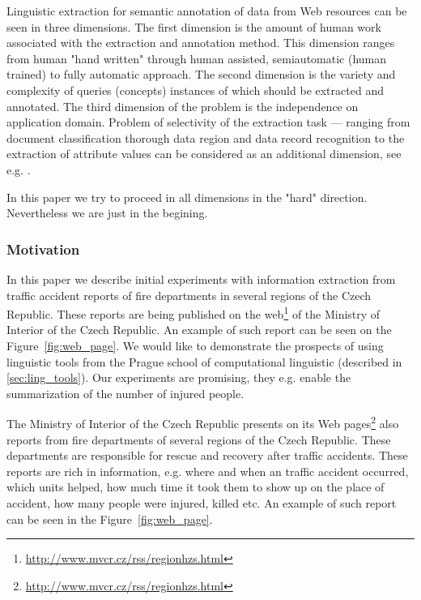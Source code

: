 Linguistic extraction for semantic annotation of data from Web resources can be seen in three dimensions. The first dimension is the amount of human work associated with the extraction and annotation method. This dimension ranges from human "hand written"  through human assisted, semiautomatic (human trained) to fully automatic approach. The second dimension is the variety and complexity of queries (concepts) instances of which should be extracted and annotated. The third dimension of the problem is the independence on application domain. Problem of selectivity of the extraction task --- ranging from document classification thorough data region and data record recognition to the extraction of attribute values can be considered as an additional dimension, see e.g.  \citep{biblio:Survey_of_Web_Information_Extraction_Systems}. 

In this paper we try to proceed in all dimensions in the "hard" direction. Nevertheless we are just in the begining.

\subsubsection{Motivation}



In this paper we describe initial experiments with information extraction from traffic accident reports of fire departments in several regions of the Czech Republic. These reports are being published on the web\footnote{\url{http://www.mvcr.cz/rss/regionhzs.html}} of the Ministry of Interior of the Czech Republic. An example of such report can be seen on the Figure~\ref{fig:web_page}. We would like to demonstrate the prospects of using linguistic tools from the Prague school of computational linguistic (described in \ref{sec:ling_tools}). Our experiments are promising, they e.g. enable the summarization of the number of injured people. 

The Ministry of Interior of the Czech Republic presents on its Web pages\footnote{\url{http://www.mvcr.cz/rss/regionhzs.html}} also reports from fire departments of several regions of the Czech Republic. These departments are responsible for rescue and recovery after traffic accidents. These reports are rich in information, e.g. where and when an traffic accident occurred, which units helped, how much time it took them to show up on the place of accident, how many people were injured, killed etc. An example of such report can be seen in the Figure~\ref{fig:web_page}.






